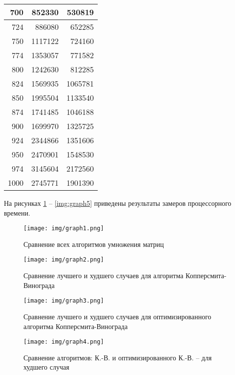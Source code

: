 \begin{table}[h]
\begin{center}
\begin{threeparttable}
\begin{tabular}{|r|r|r|}
		\hline
		700 & 852330 & 530819 \\
		\hline
		724 & 886080 & 652285 \\
		\hline
		750 & 1117122 & 724160 \\
		\hline
		774 & 1353057 & 771582 \\
		\hline
		800 & 1242630 & 812285 \\
		\hline
		824 & 1569935 & 1065781 \\
		\hline
		850 & 1995504 & 1133540 \\
		\hline
		874 & 1741485 & 1046188 \\
		\hline
		900 & 1699970 & 1325725 \\
		\hline
		924 & 2344866 & 1351606 \\
		\hline
		950 & 2470901 & 1548530 \\
		\hline
		974 & 3145604 & 2172560 \\
		\hline
		1000 & 2745771 & 1901390 \\
		\hline
		\end{tabular}
	\end{threeparttable}
\end{center}
\end{table}

\clearpage

На рисунках \ref{img:graph1} -- \ref{img:graph5} приведены результаты замеров процессорного времени.

\begin{figure}[ht]
	\centering
	\texttt{[image: img/graph1.png]}
	\caption{Сравнение всех алгоритмов умножения матриц}
	\label{img:graph1}
\end{figure}

\FloatBarrier

\begin{figure}[ht]
	\centering
	\texttt{[image: img/graph2.png]}
	\caption{Сравнение лучшего и худшего случаев для алгоритма Копперсмита-Винограда}
	\label{img:graph2}
\end{figure}

\FloatBarrier

\begin{figure}[ht]
	\centering
	\texttt{[image: img/graph3.png]}
	\caption{Сравнение лучшего и худшего случаев для оптимизированного алгоритма Копперсмита-Винограда}
	\label{img:graph3}
\end{figure}

\FloatBarrier

\begin{figure}[ht]
	\centering
	\texttt{[image: img/graph4.png]}
	\caption{Сравнение алгоритмов: К.-В. и оптимизированного К.-В. -- для худшего случая}
	\label{img:graph4}
\end{figure}

